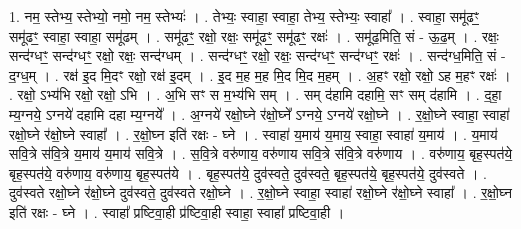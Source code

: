 \documentclass[17pt]{extarticle}
\begin{document}
1. नम॒ स्तेभ्य॒ स्तेभ्यो॒ नमो॒ नम॒ स्तेभ्यः॑ । . तेभ्यः॒ स्वाहा॒ स्वाहा॒ तेभ्य॒ स्तेभ्यः॒ स्वाहा᳚ । . स्वाहा॒ समू॑ढꣳ॒॒ समू॑ढꣳ॒॒ स्वाहा॒ स्वाहा॒ समू॑ढम् । . समू॑ढꣳ॒॒ रक्षो॒ रक्षः॒ समू॑ढꣳ॒॒ समू॑ढꣳ॒॒ रक्षः॑ । . समू॑ढ॒मिति॒ सं - ऊ॒ढ॒म् । . रक्षः॒ सन्द॑ग्धꣳ॒॒ सन्द॑ग्धꣳ॒॒ रक्षो॒ रक्षः॒ सन्द॑ग्धम् । . सन्द॑ग्धꣳ॒॒ रक्षो॒ रक्षः॒ सन्द॑ग्धꣳ॒॒ सन्द॑ग्धꣳ॒॒ रक्षः॑ । . सन्द॑ग्ध॒मिति॒ सं - द॒ग्ध॒म् । . रक्ष॑ इ॒द मि॒दꣳ रक्षो॒ रक्ष॑ इ॒दम् । . इ॒द म॒ह म॒ह मि॒द मि॒द म॒हम् । . अ॒हꣳ रक्षो॒ रक्षो॒ ऽह म॒हꣳ रक्षः॑ । . रक्षो॒ ऽभ्य॑भि रक्षो॒ रक्षो॒ ऽभि । . अ॒भि सꣳ स म॒भ्य॑भि सम् । . सम् द॑हामि दहामि॒ सꣳ सम् द॑हामि । . द॒हा॒ म्य॒ग्नये॒ ऽग्नये॑ दहामि दहा म्य॒ग्नये᳚ । . अ॒ग्नये॑ रक्षो॒घ्ने र॑क्षो॒घ्ने᳚ ऽग्नये॒ ऽग्नये॑ रक्षो॒घ्ने । . र॒क्षो॒घ्ने स्वाहा॒ स्वाहा॑ रक्षो॒घ्ने र॑क्षो॒घ्ने स्वाहा᳚ । . र॒क्षो॒घ्न इति॑ रक्षः - घ्ने । . स्वाहा॑ य॒माय॑ य॒माय॒ स्वाहा॒ स्वाहा॑ य॒माय॑ । . य॒माय॑ सवि॒त्रे स॑वि॒त्रे य॒माय॑ य॒माय॑ सवि॒त्रे । . स॒वि॒त्रे वरु॑णाय॒ वरु॑णाय सवि॒त्रे स॑वि॒त्रे वरु॑णाय । . वरु॑णाय॒ बृह॒स्पत॑ये॒ बृह॒स्पत॑ये॒ वरु॑णाय॒ वरु॑णाय॒ बृह॒स्पत॑ये । . बृह॒स्पत॑ये॒ दुव॑स्वते॒ दुव॑स्वते॒ बृह॒स्पत॑ये॒ बृह॒स्पत॑ये॒ दुव॑स्वते । . दुव॑स्वते रक्षो॒घ्ने र॑क्षो॒घ्ने दुव॑स्वते॒ दुव॑स्वते रक्षो॒घ्ने । . र॒क्षो॒घ्ने स्वाहा॒ स्वाहा॑ रक्षो॒घ्ने र॑क्षो॒घ्ने स्वाहा᳚ । . र॒क्षो॒घ्न इति॑ रक्षः - घ्ने । . स्वाहा᳚ प्रष्टिवा॒ही प्र॑ष्टिवा॒ही स्वाहा॒ स्वाहा᳚ प्रष्टिवा॒ही । \newline
\end{document}
